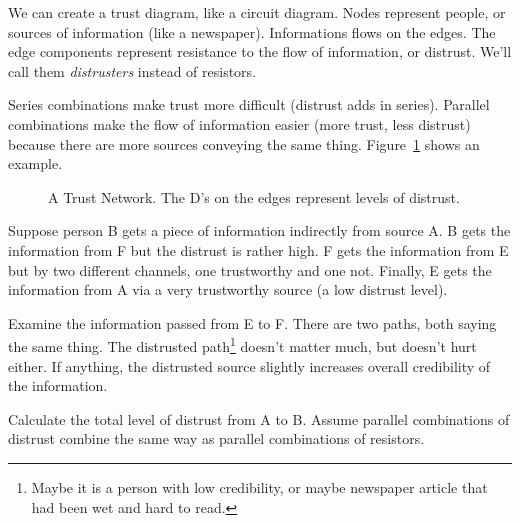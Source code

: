We can create a trust diagram, like a circuit diagram. Nodes represent people, or sources of information (like a newspaper). Informations flows on the edges. The edge components represent resistance to the flow of information, or distrust. We'll call them \emph{distrusters} instead of resistors.\par

Series combinations make trust more difficult (distrust adds in series). Parallel combinations make the flow of information easier (more trust, less distrust) because there are more sources conveying the same thing. Figure~\ref{F:3T} shows an example.

\begin{figure}[H]
\begin{center}
\caption{A Trust Network. The D's  on the edges represent levels of distrust.}
\label{F:3T}
\end{center}
\end{figure}

Suppose person B gets a piece of information indirectly from source A. B gets the information from F but the distrust is rather high. F gets the information from E but by two different channels, one trustworthy and one not. Finally, E gets the information from A via a very trustworthy source (a low distrust level).\par

Examine the information passed from E to F. There are two paths, both saying the same thing. The distrusted path\footnote{Maybe it is a person with low credibility, or maybe newspaper article that had been wet and hard to read.} doesn't matter much, but doesn't hurt either. If anything, the distrusted source slightly increases overall credibility of the information.\par

\begin{blevel}
Calculate the total level of distrust from A to B. Assume parallel combinations of distrust combine the same way as parallel combinations of resistors.
\end{blevel}

